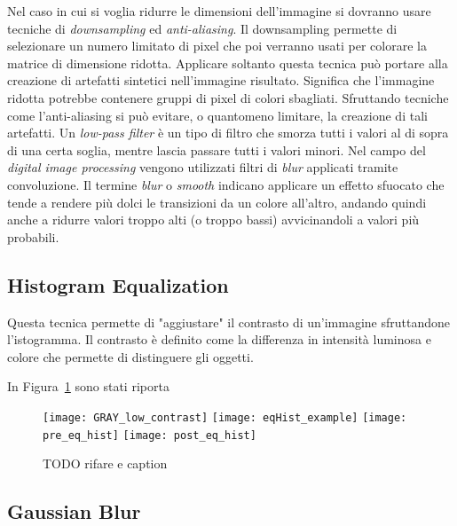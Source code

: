 Nel caso in cui si voglia ridurre le dimensioni dell'immagine si dovranno usare tecniche di \textit{downsampling} ed \textit{anti-aliasing}.
Il downsampling permette di selezionare un numero limitato di pixel che poi verranno usati per colorare la matrice di dimensione ridotta.
Applicare soltanto questa tecnica può portare alla creazione di artefatti sintetici nell'immagine risultato.
Significa che l'immagine ridotta potrebbe contenere gruppi di pixel di colori sbagliati.
Sfruttando tecniche come l'anti-aliasing si può evitare, o quantomeno limitare, la creazione di tali artefatti.
Un \textit{low-pass filter} è un tipo di filtro che smorza tutti i valori al di sopra di una certa soglia, mentre lascia passare tutti i valori minori.
Nel campo del \textit{digital image processing} vengono utilizzati filtri di \textit{blur} applicati tramite convoluzione.
Il termine \textit{blur} o \textit{smooth} indicano applicare un effetto sfuocato che tende a rendere più dolci le transizioni da un colore all'altro, andando quindi anche a ridurre valori troppo alti (o troppo bassi) avvicinandoli a valori più probabili.


\clearpage
\subsection {Histogram Equalization}
Questa tecnica permette di "aggiustare" il contrasto di un'immagine sfruttandone l'istogramma.
Il contrasto è definito come la differenza in intensità luminosa e colore che permette di distinguere gli oggetti.

In Figura~\ref{fig:hist_eq_example} sono stati riporta

\begin{figure}[ht]
  \begin{center}
    \texttt{[image: GRAY\_low\_contrast]}
    \texttt{[image: eqHist\_example]}
    \texttt{[image: pre\_eq\_hist]}
    \texttt{[image: post\_eq\_hist]}
    \label{fig:hist_eq_example}
    \caption{TODO rifare e caption}
  \end{center}
\end{figure}



\clearpage
\subsection {Gaussian Blur}

